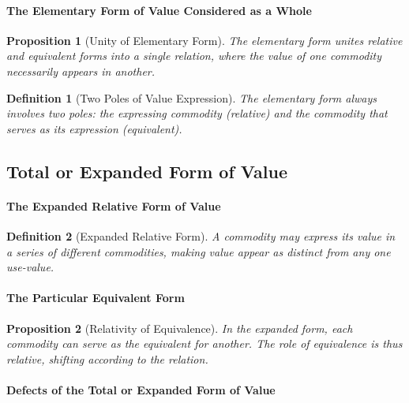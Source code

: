 \documentclass{article}
\newtheorem{innerdef}{Definition}
\newtheorem{innerprop}{Proposition}
\newenvironment{definition}{\begin{innerdef}}{\end{innerdef}}
\newenvironment{proposition}{\begin{innerprop}}{\end{innerprop}}
\begin{document}
\paragraph{The Elementary Form of Value Considered as a Whole} %

\begin{proposition}[Unity of Elementary Form]
The elementary form unites relative and equivalent forms into a single relation, 
where the value of one commodity necessarily appears in another.
\end{proposition}

\begin{definition}[Two Poles of Value Expression]
The elementary form always involves two poles: the expressing commodity (relative) 
and the commodity that serves as its expression (equivalent).
\end{definition}

\subsection{Total or Expanded Form of Value} %

\paragraph{The Expanded Relative Form of Value} %

\begin{definition}[Expanded Relative Form]
A commodity may express its value in a series of different commodities, 
making value appear as distinct from any one use-value.
\end{definition}

\paragraph{The Particular Equivalent Form} %

\begin{proposition}[Relativity of Equivalence]
In the expanded form, each commodity can serve as the equivalent for another.  
The role of equivalence is thus relative, shifting according to the relation.
\end{proposition}

\paragraph{Defects of the Total or Expanded Form of Value} %
\end{document}
